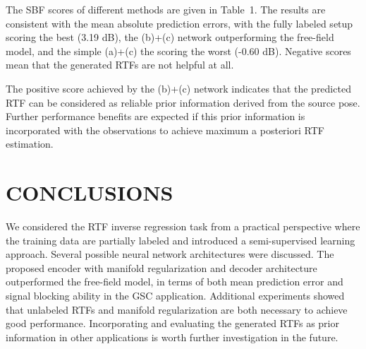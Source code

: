 \documentclass{article}
\begin{document}
The SBF scores of different methods are given in Table~1. The results are consistent with the mean absolute prediction errors, with the fully labeled setup scoring the best (3.19 dB), the (b)+(c) network outperforming the free-field model, and the simple (a)+(c) the scoring the worst (-0.60 dB). Negative scores mean that the generated RTFs are not helpful at all.

The positive score achieved by the (b)+(c) network indicates that the predicted RTF can be considered as reliable prior information derived from the source pose. Further performance benefits are expected if this prior information is incorporated with the observations to achieve maximum a posteriori RTF estimation.


\section{CONCLUSIONS}
\label{sec:con}

We considered the RTF inverse regression task from a practical perspective where the training data are partially labeled and introduced a semi-supervised learning approach. Several possible neural network architectures were discussed. The proposed encoder with manifold regularization and decoder architecture outperformed the free-field model, in terms of both mean prediction error and signal blocking ability in the GSC application. Additional experiments showed that unlabeled RTFs and manifold regularization are both necessary to achieve good performance. Incorporating and evaluating the generated RTFs as prior information in other applications is worth further investigation in the future.



%
%
%
\end{document}
